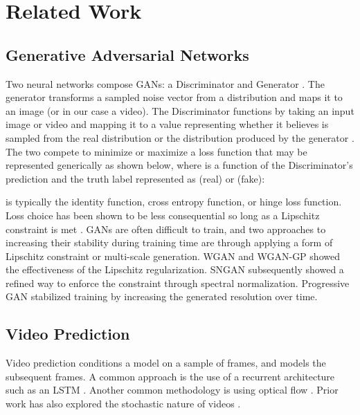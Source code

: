 \documentclass[tablecaption=bottom,pmlr]{jmlr}
\begin{document}
\section{Related Work}

\subsection{Generative Adversarial Networks}

Two neural networks compose GANs: a Discriminator  and Generator . The generator transforms a sampled noise vector  from a distribution  and maps it to an image (or in our case a video). The Discriminator functions by taking an input image or video  and mapping it to a value representing whether it believes  is sampled from the real distribution  or the distribution produced by the generator . The two compete to minimize or maximize a loss function that may be represented generically as shown below, where  is a function of the Discriminator's prediction and the truth label represented as  (real) or  (fake):



 is typically the identity function, cross entropy function, or hinge loss function. Loss choice has been shown to be less consequential so long as a Lipschitz constraint is met \citep{lossfuncgan}. GANs are often difficult to train, and two approaches to increasing their stability during training time are through applying a form of Lipschitz constraint or multi-scale generation. WGAN \citep{wgan} and WGAN-GP \citep{wgangp} showed the effectiveness of the Lipschitz regularization. SNGAN \citep{sngan} subsequently showed a refined way to enforce the constraint through spectral normalization. Progressive GAN \citep{proggan} stabilized training by increasing the generated resolution over time.

\subsection{Video Prediction}

Video prediction conditions a model on a sample of frames, and models the subsequent frames. A common approach is the use of a recurrent architecture such as an LSTM \citep{vidrecurrent1,vidrecurrent2,vidrecurrent3,vidrecurrent4,vidrecurrent5,vidrecurrent6}. Another common methodology is using optical flow \citep{flow1,flow2,flow3,flow4}. Prior work has also explored the stochastic nature of videos \citep{stochasticgen,stochasticvar,savp,slatentres,stochhighfid}.
\end{document}

